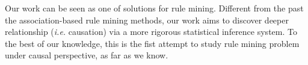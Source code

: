 Our work can be seen as one of solutions for rule mining.
Different from the past the association-based rule mining methods,
our work aims to discover deeper relationship ({\it i.e.} causation) via a more rigorous statistical inference system.
To the best of our knowledge, this is the fist attempt to study rule mining problem under causal perspective, as far as we know.











